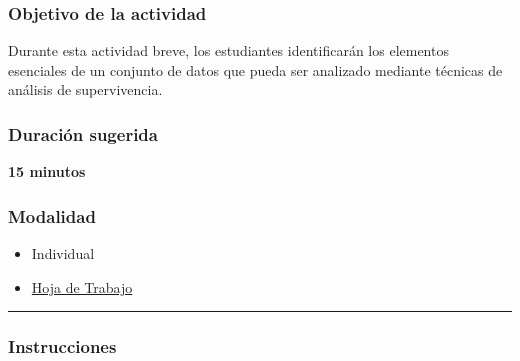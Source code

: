 \documentclass[
  letterpaper,
  DIV=11,
  numbers=noendperiod]{scrartcl}
\providecommand{\tightlist}{%
  \setlength{\itemsep}{0pt}\setlength{\parskip}{0pt}}
\begin{document}
\subsubsection{Objetivo de la actividad}\label{objetivo-de-la-actividad}

Durante esta actividad breve, los estudiantes identificarán los
elementos esenciales de un conjunto de datos que pueda ser analizado
mediante técnicas de análisis de supervivencia.

\subsubsection{Duración sugerida}\label{duraciuxf3n-sugerida}

\textbf{15 minutos}

\subsubsection{Modalidad}\label{modalidad}

\begin{itemize}
\tightlist
\item
  Individual
\item
  \href{https://tinyurl.com/mrkww672}{Hoja de Trabajo}
\end{itemize}

\begin{center}\rule{0.5\linewidth}{0.5pt}\end{center}

\subsubsection{Instrucciones}\label{instrucciones}
\end{document}

